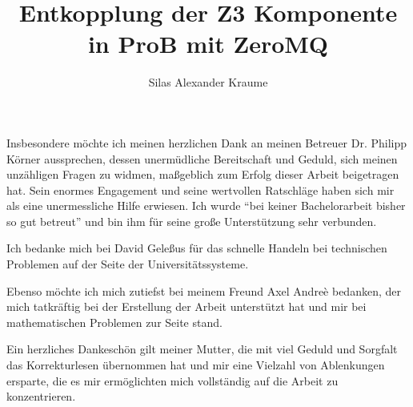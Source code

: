 \documentclass{hhuthesis}
\author{Silas Alexander Kraume}
\title{Entkopplung der Z3 Komponente in ProB mit ZeroMQ}
\begin{document}
\frontmatter
\makefrontmatter

\begin{acknowledgements}
  Insbesondere möchte ich meinen herzlichen Dank an meinen Betreuer Dr. Philipp Körner aussprechen,
  dessen unermüdliche Bereitschaft und Geduld, sich meinen unzähligen Fragen zu widmen, maßgeblich zum Erfolg dieser Arbeit beigetragen hat.
  Sein enormes Engagement und seine wertvollen Ratschläge haben sich mir als eine unermessliche Hilfe erwiesen.
  Ich wurde \enquote{bei keiner Bachelorarbeit bisher so gut betreut} und bin ihm für seine große Unterstützung sehr verbunden.

  Ich bedanke mich bei David Geleßus für das schnelle Handeln bei technischen Problemen auf der Seite der Universitätssysteme.

  Ebenso möchte ich mich zutiefst bei meinem Freund Axel Andreè bedanken,
  der mich tatkräftig bei der Erstellung der Arbeit unterstützt hat und mir bei mathematischen Problemen zur Seite stand.

  Ein herzliches Dankeschön gilt meiner Mutter,
  die mit viel Geduld und Sorgfalt das Korrekturlesen übernommen hat und mir eine Vielzahl von Ablenkungen ersparte,
  die es mir ermöglichten mich vollständig auf die Arbeit zu konzentrieren.
\end{acknowledgements}

\tableofcontents

\clearpage
\listoftables\thispagestyle{headings}
\listoffigures
\lstlistoflistings %

\mainmatter

\end{document}
